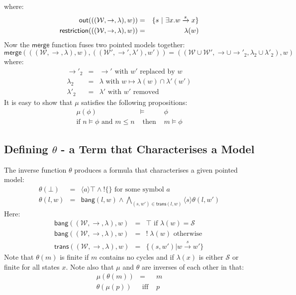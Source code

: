 where:
\begin{eqnarray}
\mathsf{out}(((\mathcal{W},\rightarrow,\lambda),w)) & = & \{ s \ | \  \exists x . w \xrightarrow{s} x \} \nonumber \\
\mathsf{restriction}(((\mathcal{W},\rightarrow,\lambda),w)) & = & \lambda(w) \nonumber
\end{eqnarray}
Now the $\mathsf{merge}$ function fuses two pointed models together:
\[
\mathsf{merge}( ( (\mathcal{W}, \rightarrow, \lambda), w),  ( (\mathcal{W}', \rightarrow', \lambda'), w')) = ((\mathcal{W} \cup \mathcal{W}', \rightarrow \cup \rightarrow'_2, \lambda_2 \cup \lambda'_2), w)
\]
where:
\begin{eqnarray}
\rightarrow'_2 & = & \rightarrow' \mbox{ with } w' \mbox{ replaced by } w \nonumber \\
\lambda_2 & = & \lambda \mbox{ with } w \mapsto \lambda(w) \cap \lambda'(w') \nonumber \\
\lambda'_2 & = & \lambda' \mbox{ with } w' \mbox{ removed } \nonumber
\end{eqnarray}
It is easy to show that $\mu$ satisfies the following propositions:
\begin{eqnarray}
\mu(\phi) & \models & \phi \nonumber \\
\mbox{if }n \models \phi \mbox{ and } m \leq n & \mbox{ then } & m \models \phi \nonumber
\end{eqnarray}
\subsection{Defining $\theta$ - a Term that Characterises a Model}
The inverse function $\theta$ produces a formula that characterises a given pointed model:
\begin{eqnarray}
\theta(\bot) & = & \langle a \rangle \top \land ! \{ \} \mbox{ for some symbol }a \nonumber \\
\theta(l, w) & = & \mathsf{bang}(l,w) \land \bigwedge_{(s,w') \in \mathsf{trans}(l,w)} \langle s \rangle \theta(l, w') \nonumber 
\end{eqnarray}
Here:
\begin{eqnarray}
\mathsf{bang}((\mathcal{W},\rightarrow,\lambda),w) & = & \top \mbox{ if } \lambda(w) = \mathcal{S} \nonumber \\
\mathsf{bang}((\mathcal{W},\rightarrow,\lambda),w) & = & ! \; \lambda(w) \mbox{ otherwise } \nonumber \\
\mathsf{trans}((\mathcal{W},\rightarrow, \lambda),w) & = & \{(s,w') | w \xrightarrow{s} w' \} \nonumber
\end{eqnarray}
Note that $\theta(m)$ is finite if $m$ contains no cycles and if $\lambda(x)$ is either $\mathcal{S}$ or finite for all states $x$.
Note also that $\mu$ and $\theta$ are inverses of each other in that:
\begin{eqnarray}
\mu(\theta(m)) & = & m \nonumber \\
\theta(\mu(p)) & \mbox{ iff } & p \nonumber
\end{eqnarray}

